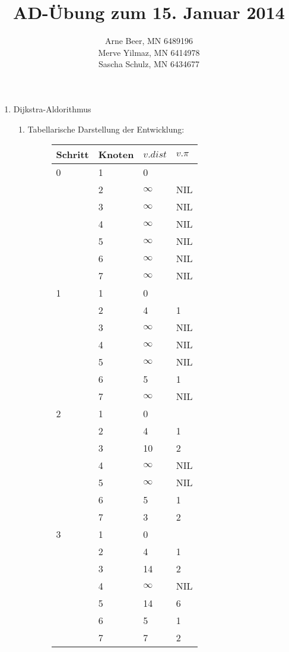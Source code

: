 \documentclass{article}
\title{AD-Übung zum 15. Januar 2014}
\author{Arne Beer, MN 6489196\\
Merve Yilmaz, MN 6414978\\
Sascha Schulz, MN 6434677}
\begin{document}
\maketitle

\begin{enumerate}[\bfseries1.]
\item Dijkstra-Aldorithmus
    \begin{enumerate}
        \item Tabellarische Darstellung der Entwicklung:
        
\begin{figure}[ht]
\begin{minipage}[b]{0.45\linewidth}
\centering
\begin{tabular}{l|l|l|l}
\hline
Schritt & Knoten & $v.dist$ & $v.\pi$\\
\hline
0 & 1 & 0 & \\
  & 2 & $\infty$ & NIL\\
  & 3 & $\infty$ & NIL\\
  & 4 & $\infty$ & NIL\\
  & 5 & $\infty$ & NIL\\
  & 6 & $\infty$ & NIL\\
  & 7 & $\infty$ & NIL\\
\hline
1 & 1 & 0 & \\
  & 2 & 4 & 1\\
  & 3 & $\infty$ & NIL\\
  & 4 & $\infty$ & NIL\\
  & 5 & $\infty$ & NIL\\
  & 6 & 5 & 1\\
  & 7 & $\infty$ & NIL\\
\hline
2 & 1 & 0 & \\
  & 2 & 4 & 1\\
  & 3 & 10 & 2\\
  & 4 & $\infty$ & NIL\\
  & 5 & $\infty$ & NIL\\
  & 6 & 5 & 1\\
  & 7 & 3 & 2\\
\hline
3 & 1 & 0 & \\
  & 2 & 4 & 1\\
  & 3 & 14 & 2\\
  & 4 & $\infty$ & NIL\\
  & 5 & 14 & 6\\
  & 6 & 5 & 1\\
  & 7 & 7 & 2\\
\hline
\end{tabular}


\end{minipage}
\end{figure}
\end{enumerate}
\end{enumerate}
\end{document}
